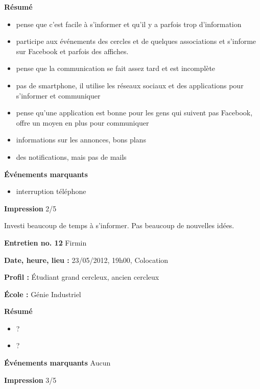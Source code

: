 \documentclass[a4paper, 11px]{article}
\begin{document}
\textbf{Résumé}
	\begin{itemize}

		\item pense que c'est facile à s'informer et qu'il y a parfois trop d'information
		\item participe aux événements des cercles et de quelques associations et s'informe sur Facebook et parfois des affiches.
		\item pense que la communication se fait assez tard et est incomplète
		\item pas de smartphone, il utilise les réseaux sociaux et des applications pour s'informer et communiquer
		\item pense qu'une application est bonne pour les gens qui suivent pas Facebook, offre un moyen en plus pour communiquer
		\item informations sur les annonces, bons plans
		\item des notifications, mais pas de mails
	\end{itemize}

\vspace{.25cm}
\textbf{Événements marquants}
	\begin{itemize}
		\item interruption téléphone
	\end{itemize}

\vspace{.25cm}
\textbf{Impression}
2/5

Investi beaucoup de temps à s'informer. Pas beaucoup de nouvelles idées.



\vspace{.3cm}

 \textbf {\large Entretien no. 12}
Firmin

\textbf{Date, heure, lieu : }
23/05/2012, 19h00, Colocation

\textbf{Profil : }
Étudiant grand cercleux, ancien cercleux

\textbf{École : }
Génie Industriel

\textbf{Résumé}
	\begin{itemize}
		\item ?
		\item ?
	\end{itemize}

\textbf{Événements marquants}
Aucun

\textbf{Impression}
3/5

\end{document}
